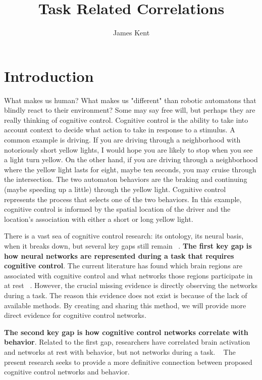 \documentclass[phd,appendix,figures]{uithesis}
\title{Task Related Correlations}
\author{James Kent}
\begin{document}
\frontmatter
\chapter{Introduction}

What makes us human?
What makes us "different" than robotic automatons that blindly react to their environment?
Some may say free will, but perhaps they are really thinking of cognitive control.
Cognitive control is the ability to take into account context to decide what action to take in response to a stimulus. 
A common example is driving.
If you are driving through a neighborhood with notoriously short yellow lights, I would hope you are likely to stop when you see a light turn yellow.
On the other hand, if you are driving through a neighborhood where the yellow light lasts for eight, maybe ten seconds, you may cruise through the intersection.
The two automaton behaviors are the braking and continuing (maybe speeding up a little) through the yellow light.
Cognitive control represents the process that selects one of the two behaviors.
In this example, cognitive control is informed by the spatial location of the driver and the location's association with either a short or long yellow light.

There is a vast sea of cognitive control research: its ontology, its neural basis, when it breaks down, but several key gaps still remain ~\citep{Gratton2017,Dosenbach2010,Braver2000}.
\textbf{The first key gap is how neural networks are represented during a task that requires cognitive control}.
The current literature has found which brain regions are associated with cognitive control and what networks those regions participate in at rest ~\citep{Gratton2017a,Lerman-Sinkoff2017,Herd2006,Rizio2012,Cooper2015,AppelBaum2014,Dosenbach2007}.
However, the crucial missing evidence is directly observing the networks during a task.
The reason this evidence does not exist is because of the lack of available methods.
By creating and sharing this method, we will provide more direct evidence for cognitive control networks.

\textbf{The second key gap is how cognitive control networks correlate with behavior}.
Related to the first gap, researchers have correlated brain activation and networks at rest with behavior, but not networks during a task. ~\citep{nomura2010b,Egner2004,Gonthier2016a,Braver2010,Huang2017}
The present research seeks to provide a more definitive connection between proposed cognitive control networks and behavior.
\end{document}
